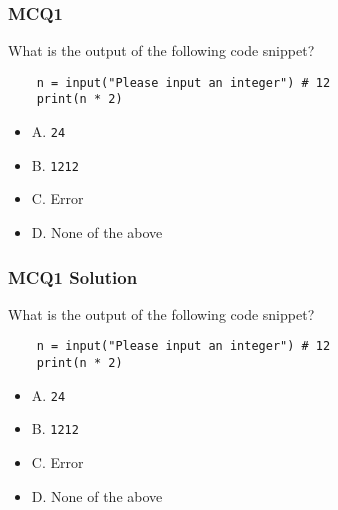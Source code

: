 \documentclass{beamer}
\begin{document}
\begin{frame}[fragile]
    \frametitle{MCQ1}
    What is the output of the following code snippet?
    \begin{verbatim}
    n = input("Please input an integer") # 12
    print(n * 2)
    \end{verbatim}

    \begin{itemize}
        \item A. \texttt{24}
        \item B. \texttt{1212}
        \item C. Error
        \item D. None of the above
    \end{itemize}
\end{frame}
\begin{frame}[fragile]
    \frametitle{MCQ1 Solution}
    What is the output of the following code snippet?
    \begin{verbatim}
    n = input("Please input an integer") # 12
    print(n * 2)
    \end{verbatim}

    \begin{itemize}
        \item A. \texttt{24}
        \item \alert{B. \texttt{1212}}
        \item C. Error
        \item D. None of the above
    \end{itemize}
\end{frame}
\end{document}
